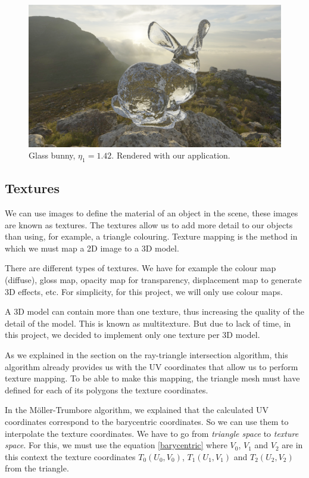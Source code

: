 \documentclass[titlepage,12pt]{report}
\begin{document}
\begin{figure}[H]
	\centering
	\includegraphics[scale=0.65]{media/CapeHill_cristal_bunny.png}
	\caption{Glass bunny, $\eta_1 = 1.42$. Rendered with our application.}
	\label{dielectric1}
\end{figure}

\subsection{Textures}

We can use images to define the material of an object in the scene, these images are known as textures. The textures allow us to add more detail to our objects than using, for example, a triangle colouring. Texture mapping is the method in which we must map a 2D image to a 3D model.

There are different types of textures. We have for example the colour map (diffuse), gloss map, opacity map for transparency, displacement map to generate 3D effects, etc. For simplicity, for this project, we will only use colour maps.

A 3D model can contain more than one texture, thus increasing the quality of the detail of the model. This is known as multitexture. But due to lack of time, in this project, we decided to implement only one texture per 3D model.

As we explained in the section on the ray-triangle intersection algorithm, this algorithm already provides us with the UV coordinates that allow us to perform texture mapping. To be able to make this mapping, the triangle mesh must have defined for each of its polygons the texture coordinates.

In the Möller-Trumbore algorithm, we explained that the calculated UV coordinates correspond to the barycentric coordinates. So we can use them to interpolate the texture coordinates. We have to go from \textit{triangle space} to \textit{texture space}. For this, we must use the equation \ref{barycentric} where $V_0$, $V_1$ and $V_2$ are in this context the texture coordinates $T_0(U_0, V_0)$, $T_1(U_1, V_1)$ and $T_2(U_2, V_2)$ from the triangle.
\end{document}
